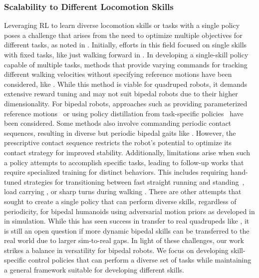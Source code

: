 \subsubsection{Scalability to Different Locomotion Skills}
Leveraging RL to learn diverse locomotion skills or tasks with a single policy poses a challenge that arises from the need to optimize multiple objectives for different tasks, as noted in \cite{kalashnikov2021mt}. 
Initially, efforts in this field focused on single skills with fixed tasks, like just walking forward in \cite{peng2020learning,siekmann2020learning,kumar2021rma}.
In developing a single-skill policy capable of multiple tasks, methods that provide varying commands for tracking different walking velocities without specifying reference motions have been considered, like \cite{hwangbo2019learning,fu2021minimizing,cheng2023legs}. 
While this method is viable for quadruped robots, it demands extensive reward tuning and may not suit bipedal robots due to their higher dimensionality.
For bipedal robots, approaches such as providing parameterized reference motions~\citep{li2021reinforcement} or using policy distillation from task-specific policies~\citep{xie2020learning} have been considered. 
Some methods also involve commanding periodic contact sequences, resulting in diverse but periodic bipedal gaits like \cite{siekmann2021sim}. 
However, the prescriptive contact sequence restricts the robot's potential to optimize its contact strategy for improved stability. 
Additionally, limitations arise when such a policy attempts to accomplish specific tasks, leading to follow-up works that require specialized training for distinct behaviors. 
This includes requiring hand-tuned strategies for transitioning between fast straight running and standing~\citep{crowley2023optimizing}, load carrying \citep{dao2022sim}, or sharp turns during walking \citep{yu2022dynamic}.
There are other attempts that sought to create a single policy that can perform diverse skills, regardless of periodicity, for bipedal humanoids using adversarial motion priors as developed in \cite{peng2021amp} in simulation. 
While this has seen success in transfer to real quadrupeds like \cite{escontrela2022adversarial,wu2023learning,li2023learning}, it is still an open question if more dynamic bipedal skills can be transferred to the real world due to larger sim-to-real gaps.
In light of these challenges, our work strikes a balance in versatility for bipedal robots.
We focus on developing skill-specific control policies that can perform a diverse set of tasks while maintaining a general framework suitable for developing different skills.